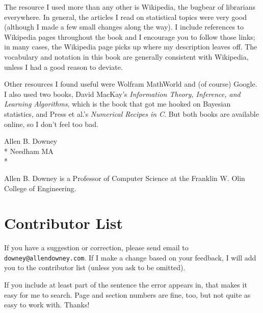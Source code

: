 \documentclass[12pt]{book}
\begin{document}
The resource I used more than any other is Wikipedia, the bugbear
of librarians everywhere.  In general, the articles I read on
statistical topics were very good (although I made a few small changes
along the way).  I include references to Wikipedia pages throughout
the book and I encourage you to follow those links; in many cases, the
Wikipedia page picks up where my description leaves off.  The
vocabulary and notation in this book are generally consistent with
Wikipedia, unless I had a good reason to deviate.

Other resources I found useful were Wolfram MathWorld and (of course)
Google.  I also used two books, David MacKay's {\em Information
  Theory, Inference, and Learning Algorithms}, which is the book that
got me hooked on Bayesian statistics, and Press et al.'s {\em
  Numerical Recipes in C}.  But both books are available online,
so I don't feel too bad.

Allen B. Downey \\*
Needham MA \\*

Allen B. Downey is a Professor of Computer Science at 
the Franklin W. Olin College of Engineering.







\section*{Contributor List}

If you have a suggestion or correction, please send email to 
{\tt downey@allendowney.com}.  If I make a change based on your
feedback, I will add you to the contributor list
(unless you ask to be omitted).

If you include at least part of the sentence the
error appears in, that makes it easy for me to search.  Page and
section numbers are fine, too, but not quite as easy to work with.
Thanks!

\small
\end{document}
